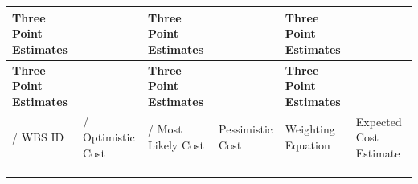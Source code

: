 \documentclass[10pt,letterpaper]{article}
\renewcommand\arraystretch{1.25}
\newcommand{\smallsection}[1]{\par\Needspace{3\baselineskip}\vspace{5pt}{\normalsize\sffamily\bfseries\color{blue}#1}\par}
\begin{document}
\smallsection{Source table 3}
\begin{center}
\begingroup
\setlength\tabcolsep{2.0pt}
\scriptsize
\renewcommand\arraystretch{1.55}
\begin{longtable}{|>{\raggedright\arraybackslash}p{0.995in}|>{\raggedright\arraybackslash}p{0.995in}|>{\raggedright\arraybackslash}p{0.995in}|>{\raggedright\arraybackslash}p{0.995in}|>{\raggedright\arraybackslash}p{0.995in}|>{\raggedright\arraybackslash}p{0.995in}|}
\hline
\rowcolor{light}
\textbf{Three Point Estimates} & \rule{0pt}{11pt}\hspace{0pt} & \textbf{Three Point Estimates} & \rule{0pt}{11pt}\hspace{0pt} & \textbf{Three Point Estimates} & \rule{0pt}{11pt}\hspace{0pt} \\ \hline
\endfirsthead
\hline\rowcolor{light} \textbf{Three Point Estimates} & \rule{0pt}{11pt}\hspace{0pt} & \textbf{Three Point Estimates} & \rule{0pt}{11pt}\hspace{0pt} & \textbf{Three Point Estimates} & \rule{0pt}{11pt}\hspace{0pt} \\ \hline
\endhead
/ WBS ID & / Optimistic Cost & / Most Likely Cost & Pessimistic Cost & Weighting Equation & Expected Cost Estimate \\ \hline
\rule{0pt}{11pt}\hspace{0pt} & \rule{0pt}{11pt}\hspace{0pt} & \rule{0pt}{11pt}\hspace{0pt} & \rule{0pt}{11pt}\hspace{0pt} & \rule{0pt}{11pt}\hspace{0pt} & \rule{0pt}{11pt}\hspace{0pt} \\ \hline
\rule{0pt}{11pt}\hspace{0pt} & \rule{0pt}{11pt}\hspace{0pt} & \rule{0pt}{11pt}\hspace{0pt} & \rule{0pt}{11pt}\hspace{0pt} & \rule{0pt}{11pt}\hspace{0pt} & \rule{0pt}{11pt}\hspace{0pt} \\ \hline
\rule{0pt}{11pt}\hspace{0pt} & \rule{0pt}{11pt}\hspace{0pt} & \rule{0pt}{11pt}\hspace{0pt} & \rule{0pt}{11pt}\hspace{0pt} & \rule{0pt}{11pt}\hspace{0pt} & \rule{0pt}{11pt}\hspace{0pt} \\ \hline

\end{longtable}
\end{center}
\end{document}
